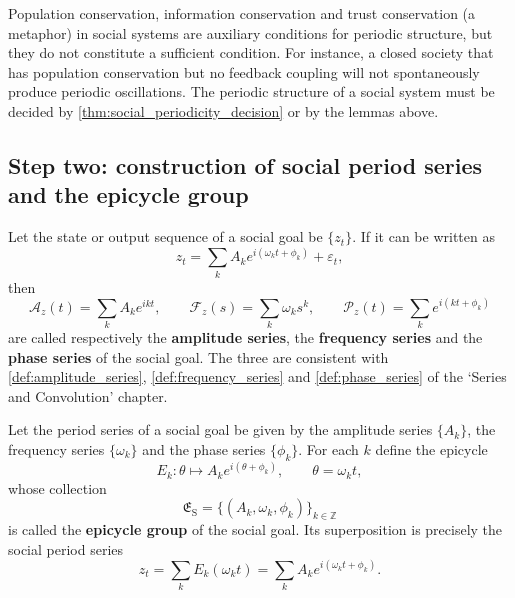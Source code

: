\begin{remark}\label{rem:social_invariant_not_period}
Population conservation, information conservation and trust conservation (a metaphor) in social systems are auxiliary conditions for periodic structure, but they do not constitute a sufficient condition. For instance, a closed society that has population conservation but no feedback coupling will not spontaneously produce periodic oscillations. The periodic structure of a social system must be decided by \cref{thm:social_periodicity_decision} or by the lemmas above.
\end{remark}

\subsection{Step two: construction of social period series and the epicycle group}

\begin{definition}\label{def:social_series}
Let the state or output sequence of a social goal be $\{z_t\}$. If it can be written as
\[
z_t=\sum_k A_k e^{i(\omega_k t+\phi_k)}+\varepsilon_t,
\]
then
\[
\mathcal A_z(t)=\sum_k A_k e^{ikt},\qquad
\mathcal F_z(s)=\sum_k \omega_k s^k,\qquad
\mathcal P_z(t)=\sum_k e^{i(kt+\phi_k)}
\]
are called respectively the \textbf{amplitude series}, the \textbf{frequency series} and the \textbf{phase series} of the social goal. The three are consistent with \cref{def:amplitude_series}, \cref{def:frequency_series} and \cref{def:phase_series} of the `Series and Convolution' chapter.
\end{definition}

\begin{definition}\label{def:social_epicycle_group}
Let the period series of a social goal be given by the amplitude series $\{A_k\}$, the frequency series $\{\omega_k\}$ and the phase series $\{\phi_k\}$. For each $k$ define the epicycle
\[
E_k:\theta\mapsto A_k e^{i(\theta+\phi_k)},\qquad \theta=\omega_k t,
\]
whose collection
\[
\mathfrak E_{\mathrm{S}}=\{(A_k,\omega_k,\phi_k)\}_{k\in\mathbb Z}
\]
is called the \textbf{epicycle group} of the social goal. Its superposition is precisely the social period series
\[
z_t=\sum_k E_k(\omega_k t)=\sum_k A_k e^{i(\omega_k t+\phi_k)}.
\]
\end{definition}

